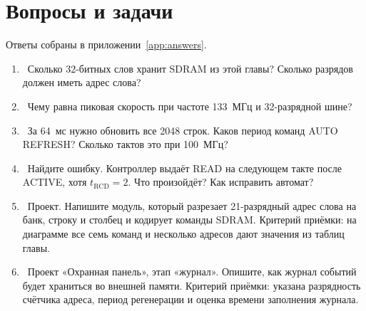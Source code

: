 \section{Вопросы и задачи}
\label{sec:tasks-sdram}

Ответы собраны в приложении~\ref{app:answers}.

\begin{taskbox}
\begin{enumerate}
  \item {}~Сколько 32-битных слов хранит SDRAM из этой главы? Сколько разрядов должен иметь адрес слова?
  \item {}~Чему равна пиковая скорость при частоте 133~МГц и 32-разрядной шине?
  \item {}~За 64~мс нужно обновить все 2048 строк. Каков период команд AUTO REFRESH? Сколько тактов это при 100~МГц?
  \item {}~Найдите ошибку. Контроллер выдаёт READ на следующем такте после ACTIVE, хотя $t_\text{RCD}=2$.
        Что произойдёт? Как исправить автомат?
  \item {}~Проект. Напишите модуль, который разрезает 21-разрядный адрес слова на банк, строку и столбец
        и кодирует команды SDRAM. Критерий приёмки: на диаграмме все семь команд и несколько адресов дают
        значения из таблиц главы.
  \item {}~Проект «Охранная панель», этап «журнал». Опишите, как журнал событий будет храниться во внешней
        памяти. Критерий приёмки: указана разрядность счётчика адреса, период регенерации и оценка времени заполнения журнала.
\end{enumerate}
\end{taskbox}
